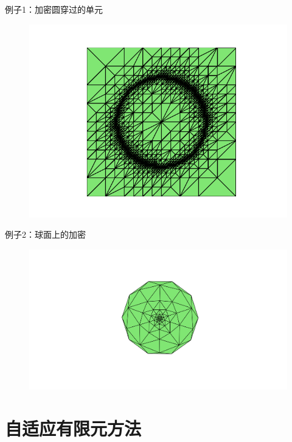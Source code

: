 \documentclass{article}
\begin{document}
例子1：加密圆穿过的单元
\begin{figure}[H]
\centering
\includegraphics[scale=0.5]{./figures/Figure_12.png}
\caption{}
\end{figure}
例子2：球面上的加密
\begin{figure}[H]
\centering
\includegraphics[scale=0.5]{./figures/Figure_11.png}
\caption{}
\end{figure}
\newpage
\section{自适应有限元方法}
\end{document}
